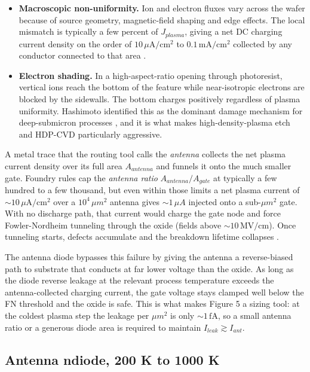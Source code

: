 \begin{itemize}
\item
  \textbf{Macroscopic non-uniformity.} Ion and electron fluxes vary
  across the wafer because of source geometry, magnetic-field shaping
  and edge effects. The local mismatch is typically a few percent of
  \(J_{plasma}\), giving a net DC charging current density on the order
  of \(10\, \mu\mathrm{A/cm^2}\) to \(0.1\, \mathrm{mA/cm^2}\) collected
  by any conductor connected to that area
  .
\item
  \textbf{Electron shading.} In a high-aspect-ratio opening through
  photoresist, vertical ions reach the bottom of the feature while
  near-isotropic electrons are blocked by the sidewalls. The bottom
  charges positively regardless of plasma uniformity. Hashimoto
  identified this as the dominant damage mechanism for deep-submicron
  processes , and it is what makes
  high-density-plasma etch and HDP-CVD particularly aggressive.
\end{itemize}

A metal trace that the routing tool calls the \emph{antenna} collects
the net plasma current density over its full area \(A_{antenna}\) and
funnels it onto the much smaller gate. Foundry rules cap the
\emph{antenna ratio} \(A_{antenna}/A_{gate}\) at typically a few hundred
to a few thousand, but even within those limits a net plasma current of
\(\sim 10\, \mu\mathrm{A/cm^2}\) over a \(10^4\, \mu m^2\) antenna gives
\(\sim 1\, \mu A\) injected onto a sub-\(\mu m^2\) gate. With no
discharge path, that current would charge the gate node and force
Fowler-Nordheim tunneling through the oxide (fields above
\(\sim 10\, \mathrm{MV/cm}\)). Once tunneling starts, defects accumulate
and the breakdown lifetime collapses .

The antenna diode bypasses this failure by giving the antenna a
reverse-biased path to substrate that conducts at far lower voltage than
the oxide. As long as the diode reverse leakage at the relevant process
temperature exceeds the antenna-collected charging current, the gate
voltage stays clamped well below the FN threshold and the oxide is safe.
This is what makes Figure 5 a sizing tool: at the coldest plasma step
the leakage per \(\mu m^2\) is only \(\sim 1\, \mathrm{fA}\), so a small
antenna ratio or a generous diode area is required to maintain
\(I_{leak} \gtrsim I_{ant}\).

\subsection{Antenna ndiode, 200 K to 1000
K}\label{antenna-ndiode-200-k-to-1000-k}

